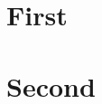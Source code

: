\documentclass[10pt,twocolumn]{article}
\begin{document}
\section{First}
\lipsum[1-3]
\section{Second}
\lipsum[4-6]
\end{document}
